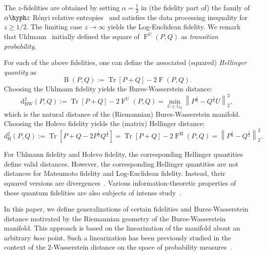 \documentclass[12pt]{article}
\theoremstyle{definition}
\begin{document}
The $z$-fidelities are obtained by setting $\alpha=\frac12$ in (the fidelity part of) the family of $\alpha\hyph z$ R\'{e}nyi relative entropies~\cite{audenaert2013alpha, Wilde2024multivariate} and satisfies the data processing inequality for $z \geq 1/2$. The limiting case $z \to \infty$ yields the Log-Euclidean fidelity. We remark that Uhlmann~\cite{uhlmann1976transition} initially defined the square of $\operatorname{F}^\mathrm U(P,Q) $ as \textit{transition probability}. 

For each of the above fidelities, one can define the associated (squared) \textit{Hellinger quantity} as
\begin{equation}
    \operatorname{B}(P, Q) := \operatorname{Tr}[P+Q] - 2 \operatorname{F}(P,Q).
\end{equation}
Choosing the Uhlmann fidelity yields the Bures-Wasserstein distance: 
\begin{equation}
\mathrm{d}_\mathrm{BW}^2(P,Q) := \operatorname{Tr}[P+Q] - 2 \operatorname{F}^\mathrm{U}(P,Q) = \min_{U \in \mathbb U_d} \left\| P ^{\frac12} - Q ^{\frac12} U \right\|_2^2,
\end{equation}
which is the natural distance of the (Riemannian) Bures-Wasserstein  manifold. Choosing the Holevo fidelity yields the (matrix) Hellinger distance:
\begin{equation}
d_\mathrm{H}^2(P,Q) := \operatorname{Tr}\left[P+Q - 2P^{\frac 12} Q^{\frac 12}\right] = \operatorname{Tr}[P+Q] - 2 \operatorname{F}^\mathrm H(P,Q) =  \left\|P^{\frac 12} - Q^{\frac 12}\right\|_2^2.
\end{equation}


For Uhlmann fidelity and Holevo fidelity, the corresponding Hellinger quantities define valid distances. However, the corresponding Hellinger quantities are not distances for Matsumoto fidelity and Log-Euclidean fidelity. Instead, their squared versions are divergences~\cite{bhatia2019Hellinger}. Various information-theoretic properties of these quantum fidelities are also subjects of intense study~\cite{Zhang2020, lin2015investigating, matsumoto2014quantum}. 

In this paper, we define generalizations of certain fidelities and Bures-Wasserstein distance motivated by the Riemannian geometry of the Bures-Wasserstein manifold. This approach is based on the linearization of the manifold about an arbitrary \emph{base} point. Such a linearization has been previously studied in the context of the 2-Wasserstein distance on the space of probability measures~\cite{ambrosio2008gradient, altschuler2021averaging, chewi2020gradient}.
\end{document}
